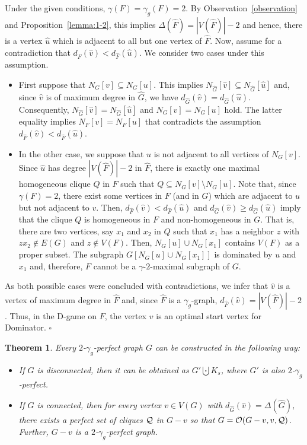 \documentclass[12pt]{article}
\newtheorem{theorem}{Theorem}[section]
\newcommand{\proof}{\noindent{\bf Proof.\ }}
\newcommand{\qed}{\hfill $\square$ \bigskip}
\newcommand{\cO}{{\cal O}}
\newcommand{\cQ}{{\cal Q}}
\begin{document}
\proof Under the given conditions, $\gamma(F)=\gamma_g(F)=2$. By Observation~\ref{observation} and Proposition~\ref{lemma:1-2}, this implies $\Delta(\widehat{F})=|V(\widehat{F})|-2$ and hence, there is a vertex $\widehat{u}$ which is adjacent to all but one vertex of $\widehat{F}$. Now, assume for a contradiction that $d_{\widehat{F}}(\widehat{v}) < d_{\widehat{F}}(\widehat{u}) $. We consider two cases under this assumption.
\begin{itemize}
	\item First suppose that $N_G[v] \subseteq N_G[u]$. This implies $N_{\widehat{G}}[\widehat{v}] \subseteq N_{\widehat{G}}[\widehat{u}]$ and, since $\widehat{v}$ is of maximum degree in $\widehat{G}$, we have $d_{\widehat{G}}(\widehat{v}) = d_{\widehat{G}}(\widehat{u})$. Consequently, $N_{\widehat{G}}[\widehat{v}] = N_{\widehat{G}}[\widehat{u}]$ and $N_G[v]=N_G[u]$ hold. The latter equality implies $N_F[v]=N_F[u]$ that contradicts the assumption $d_{\widehat{F}}(\widehat{v}) < d_{\widehat{F}}(\widehat{u}) $.
	\item In the other case, we suppose that $u$ is not adjacent to all vertices of $N_G[v]$. Since $\widehat{u}$ has degree $|V(\widehat{F})|-2$ in $\widehat{F}$, there is exactly one maximal homogeneous clique $Q$ in $F$ such that $Q \subseteq N_G[v]\setminus N_G[u]$. Note that, since $\gamma(F)=2$, there exist some vertices in $F$ (and in $G$) which are adjacent to $u$ but not adjacent to $v$. Then, $d_{\widehat{F}}(\widehat{v}) < d_{\widehat{F}}(\widehat{u}) $ and $d_{\widehat{G}}(\widehat{v}) \ge d_{\widehat{G}}(\widehat{u}) $ imply that the  clique $Q$ is homogeneous in $F$ and non-homogeneous in $G$. That is, there are two vertices, say $x_1$ and $x_2$ in $Q$  such that $x_1$ has a neighbor $z$ with $zx_2 \notin E(G)$ and $z \notin V(F)$. Then, $N_G[u]\cup N_G[x_1]$ contains $V(F)$ as a proper subset. The subgraph $G[N_G[u]\cup N_G[x_1]]$ is dominated by $u$ and $x_1$ and, therefore, $F$ cannot be a  $\gamma$-$2$-maximal subgraph of $G$. 
\end{itemize} 
 As both possible cases were concluded with contradictions, we infer that $\widehat{v}$ is a vertex of maximum degree in $\widehat{F}$ and, since $\widehat{F}$ is a $\gamma_g$-graph, $d_{\widehat{F}}(\widehat{v})= |V(\widehat{F})|-2$. Thus, in the D-game on $F$, the vertex $v$ is an optimal start vertex for Dominator. \qed

\begin{theorem}
	\label{thm:construction-perf}
	Every  $2$-$\gamma_g$-perfect graph $G$ can be constructed in the following way:
	\begin{itemize}
		\item[$(i)$] If $G$ is disconnected, then it can be obtained as $G' \bigcupdot  K_s$, where $G'$ is also $2$-$\gamma_g$-perfect.
		\item[$(ii)$] If $G$ is connected, then for every vertex $v\in V(G)$ with $d_{\widehat{G}}(\widehat{v})=\Delta(\widehat{G})$, there exists a perfect set of cliques $\cQ$ in $G-v$ so that $G=\cO(G-v, v, \cQ)$. Further, $G-v$ is a $2$-$\gamma_g$-perfect graph.
			\end{itemize} 
\end{theorem}
\end{document}

